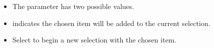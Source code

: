 \begin{itemize}
\item The  parameter has two possible values. 
\item  {} indicates the chosen item will be added to the current selection.
\item Select  to begin a new selection with the chosen item. 
\end{itemize}
